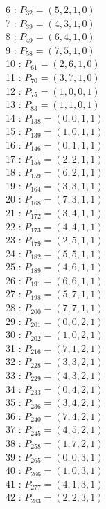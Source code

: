 \documentclass{article}
\begin{document}
{\begin{multicols}{3}
6 : $P_{32}=( 5, 2, 1, 0 )$\\
7 : $P_{39}=( 4, 3, 1, 0 )$\\
8 : $P_{49}=( 6, 4, 1, 0 )$\\
9 : $P_{58}=( 7, 5, 1, 0 )$\\
10 : $P_{61}=( 2, 6, 1, 0 )$\\
11 : $P_{70}=( 3, 7, 1, 0 )$\\
12 : $P_{75}=( 1, 0, 0, 1 )$\\
13 : $P_{83}=( 1, 1, 0, 1 )$\\
14 : $P_{138}=( 0, 0, 1, 1 )$\\
15 : $P_{139}=( 1, 0, 1, 1 )$\\
16 : $P_{146}=( 0, 1, 1, 1 )$\\
17 : $P_{155}=( 2, 2, 1, 1 )$\\
18 : $P_{159}=( 6, 2, 1, 1 )$\\
19 : $P_{164}=( 3, 3, 1, 1 )$\\
20 : $P_{168}=( 7, 3, 1, 1 )$\\
21 : $P_{172}=( 3, 4, 1, 1 )$\\
22 : $P_{173}=( 4, 4, 1, 1 )$\\
23 : $P_{179}=( 2, 5, 1, 1 )$\\
24 : $P_{182}=( 5, 5, 1, 1 )$\\
25 : $P_{189}=( 4, 6, 1, 1 )$\\
26 : $P_{191}=( 6, 6, 1, 1 )$\\
27 : $P_{198}=( 5, 7, 1, 1 )$\\
28 : $P_{200}=( 7, 7, 1, 1 )$\\
29 : $P_{201}=( 0, 0, 2, 1 )$\\
30 : $P_{202}=( 1, 0, 2, 1 )$\\
31 : $P_{216}=( 7, 1, 2, 1 )$\\
32 : $P_{228}=( 3, 3, 2, 1 )$\\
33 : $P_{229}=( 4, 3, 2, 1 )$\\
34 : $P_{233}=( 0, 4, 2, 1 )$\\
35 : $P_{236}=( 3, 4, 2, 1 )$\\
36 : $P_{240}=( 7, 4, 2, 1 )$\\
37 : $P_{245}=( 4, 5, 2, 1 )$\\
38 : $P_{258}=( 1, 7, 2, 1 )$\\
39 : $P_{265}=( 0, 0, 3, 1 )$\\
40 : $P_{266}=( 1, 0, 3, 1 )$\\
41 : $P_{277}=( 4, 1, 3, 1 )$\\
42 : $P_{283}=( 2, 2, 3, 1 )$\\

\end{multicols}}
\end{document}
